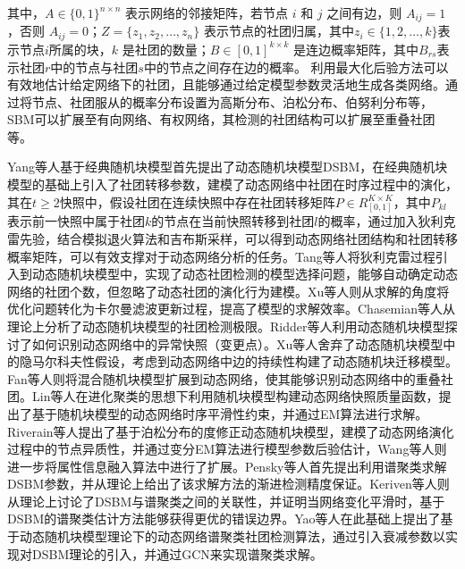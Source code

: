 其中，\( A \in \{0, 1\}^{n \times n} \) 表示网络的邻接矩阵，若节点 \( i \) 和 \( j \) 之间有边，则 \( A_{ij} = 1 \)，否则 \( A_{ij} = 0 \)；\( Z = \{z_1, z_2, \dots, z_n\} \) 表示节点的社团归属，其中\( z_i \in \{1, 2, \dots, k\} \)表示节点\( i \)所属的块，\( k \) 是社团的数量；\( B \in [0, 1]^{k \times k} \) 是连边概率矩阵，其中\( B_{rs} \)表示社团\( r \)中的节点与社团\( s \)中的节点之间存在边的概率。
利用最大化后验方法可以有效地估计给定网络下的社团，且能够通过给定模型参数灵活地生成各类网络。通过将节点、社团服从的概率分布设置为高斯分布、泊松分布、伯努利分布等，SBM可以扩展至有向网络、有权网络，其检测的社团结构可以扩展至重叠社团等。

Yang等人\cite{yang2011detecting}基于经典随机块模型首先提出了动态随机块模型DSBM，在经典随机块模型的基础上引入了社团转移参数，建模了动态网络中社团在时序过程中的演化，其在$t \ge 2$快照中，假设社团在连续快照中存在社团转移矩阵$P \in R^{K \times K}_{[0,1]}$，其中$P_{kl}$表示前一快照中属于社团$k$的节点在当前快照转移到社团$l$的概率，通过加入狄利克雷先验，结合模拟退火算法和吉布斯采样，可以得到动态网络社团结构和社团转移概率矩阵，可以有效支撑对于动态网络分析的任务。Tang等人\cite{tang2014detecting}将狄利克雷过程引入到动态随机块模型中，实现了动态社团检测的模型选择问题，能够自动确定动态网络的社团个数，但忽略了动态社团的演化行为建模。Xu等人\cite{xu2014dynamic}则从求解的角度将优化问题转化为卡尔曼滤波更新过程，提高了模型的求解效率。Chasemian等人\cite{ghasemian2016detectability}从理论上分析了动态随机块模型的社团检测极限。Ridder等人\cite{de2016detection}利用动态随机块模型探讨了如何识别动态网络中的异常快照（变更点）。Xu等人\cite{xu2015stochastic}舍弃了动态随机块模型中的隐马尔科夫性假设，考虑到动态网络中边的持续性构建了动态随机块迁移模型。Fan等人\cite{fan2014dynamic}则将混合随机块模型扩展到动态网络，使其能够识别动态网络中的重叠社团。Lin等人\cite{lin2009analyzing}在进化聚类的思想下利用随机块模型构建动态网络快照质量函数，提出了基于随机块模型的动态网络时序平滑性约束，并通过EM算法进行求解。Riverain等人\cite{riverain2023poisson}提出了基于泊松分布的度修正动态随机块模型，建模了动态网络演化过程中的节点异质性，并通过变分EM算法进行模型参数后验估计，Wang等人\cite{RJXB20241211002}则进一步将属性信息融入算法中进行了扩展。Pensky等人\cite{pensky2019spectral}首先提出利用谱聚类求解DSBM参数，并从理论上给出了该求解方法的渐进检测精度保证。Keriven等人\cite{keriven2022sparse}则从理论上讨论了DSBM与谱聚类之间的关联性，并证明当网络变化平滑时，基于DSBM的谱聚类估计方法能够获得更优的错误边界。Yao等人\cite{yao2021interpretable}在此基础上提出了基于动态随机块模型理论下的动态网络谱聚类社团检测算法，通过引入衰减参数以实现对DSBM理论的引入，并通过GCN来实现谱聚类求解。

